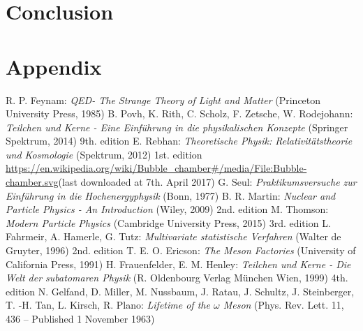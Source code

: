 \documentclass[10pt, a4paper, notitlepage, DIV=15]{scrartcl}
\begin{document}
\section{Conclusion}

\section{Appendix}

\begin{thebibliography}{}
	R. P. Feynam: \textit{QED- The Strange Theory of Light and Matter} (Princeton University Press, 1985)
	B. Povh, K. Rith, C. Scholz, F. Zetsche, W. Rodejohann: \textit{Teilchen und Kerne - Eine Einführung in die physikalischen Konzepte} (Springer Spektrum, 2014) 9th. edition
	E. Rebhan: \textit{Theoretische Physik: Relativitätstheorie und Kosmologie} (Spektrum, 2012) 1st. edition
	\url{https://en.wikipedia.org/wiki/Bubble_chamber#/media/File:Bubble-chamber.svg}\newline (last downloaded at 7th. April 2017)
	G. Seul: \textit{Praktikumsversuche zur Einführung in die Hochenergyphysik} (Bonn, 1977)
	B. R. Martin: \textit{Nuclear and Particle Physics - An Introduction} (Wiley, 2009) 2nd. edition
	M. Thomson: \textit{Modern Particle Physics} (Cambridge University Press, 2015) 3rd. edition
	L. Fahrmeir, A. Hamerle, G. Tutz: \textit{Multivariate statistische Verfahren} (Walter de Gruyter, 1996) 2nd. edition
	T. E. O. Ericson: \textit{The Meson Factories} (University of California Press, 1991)
	H. Frauenfelder, E. M. Henley: \textit{Teilchen und Kerne - Die Welt der subatomaren Physik} (R. Oldenbourg Verlag München Wien, 1999) 4th. edition
	N. Gelfand, D. Miller, M. Nussbaum, J. Ratau, J. Schultz, J. Steinberger, T. -H. Tan, L. Kirsch, R. Plano: \textit{Lifetime of the $\omega$ Meson} (Phys. Rev. Lett. 11, 436 – Published 1 November 1963)
\end{thebibliography}
 
\end{document}
